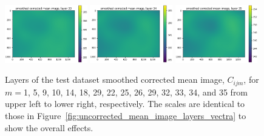 \documentclass[letterpaper,11pt]{article}
\newcommand{\reffig}[1]{Figure~\ref{#1}}
\begin{document}
\begin{figure}[!ht]
\includegraphics[width=0.32\textwidth]{images/results/smoothed_corrected_mean_image_layers_vectra/smoothed_corrected_mean_image_layer_33_same_scale}
\includegraphics[width=0.32\textwidth]{images/results/smoothed_corrected_mean_image_layers_vectra/smoothed_corrected_mean_image_layer_34_same_scale}
\includegraphics[width=0.32\textwidth]{images/results/smoothed_corrected_mean_image_layers_vectra/smoothed_corrected_mean_image_layer_35_same_scale}
\caption{\footnotesize Layers of the test dataset smoothed corrected mean image, $C_{ijm}$, for $m=$1, 5, 9, 10, 14, 18, 29, 22, 25, 26, 29, 32, 33, 34, and 35 from upper left to lower right, respectively. The scales are identical to those in \reffig{fig:uncorrected_mean_image_layers_vectra} to show the overall effects.}
\label{fig:corrected_smoothed_mean_image_layers_same_scale_vectra}
\end{figure}
\end{document}
